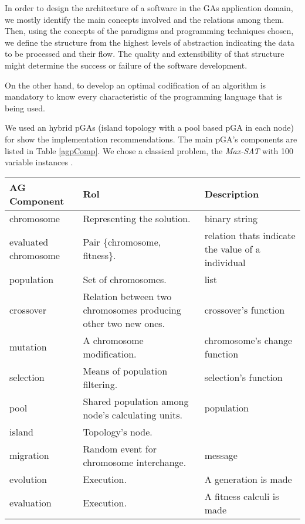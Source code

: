 
\noindent In order to design the architecture of a software in the GAs application domain, we mostly identify the main concepts involved and the relations among them. Then, using the concepts of the paradigms and programming techniques chosen, we define the structure from the highest levels of abstraction indicating the data to be processed and their flow. The quality and extensibility of that structure might determine the success or failure of the software development.

On the other hand, to develop an optimal codification of an algorithm is mandatory to know every characteristic of the programming language that is being used.

We used an hybrid pGAs (island topology with a pool based pGA in each node) for show the implementation recommendations. The main pGA’s components are listed in Table \ref{agpComp}. We chose a classical problem, the {\em Max-SAT} with 100 variable instances \cite{Hoos2000}.


\begin{table*}
  \centering
  \caption{Parallel GA components.}\label{agpComp}
  \begin{tabular}{|>{\centering}p{3cm}|p{5cm}|p{3cm}|}
   \hline
   \textbf{AG Component} & \textbf{Rol} & \textbf{Description} \\
     \hline
      chromosome & Representing the solution. & binary string \\
     \hline
      evaluated chromosome & Pair \{chromosome, fitness\}. & relation thats indicate the value of a individual\\
     \hline
      population & Set of chromosomes. & list \\
     \hline
     crossover & Relation between two chromosomes producing other two new ones. & crossover's function \\
     \hline
      mutation & A chromosome modification. & chromosome's change function \\
     \hline
     selection & Means of population filtering. & selection's function \\
     \hline
      pool & Shared population among node's calculating units. & population \\
     \hline
      island & Topology's node. &  \\
     \hline
      migration & Random event for chromosome interchange. & message \\
     \hline
      evolution & Execution. & A generation is made \\
     \hline
      evaluation & Execution. & A fitness calculi is made \\
     \hline
   \end{tabular}

\end{table*}
